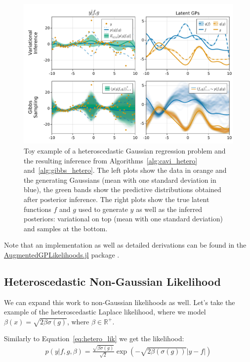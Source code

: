 \begin{figure}
\includegraphics[width=\textwidth]{./chapters/8_discussions/figures/heteroscedastic.pdf}
\caption{Toy example of a heteroscedastic Gaussian regression problem and the resulting inference from Algorithms~\ref{alg:cavi_hetero} and~\ref{alg:gibbs_hetero}.
The left plots show the data in orange and the generating Gaussians (mean with one standard deviation in blue), the green bands show the predictive distributions obtained after posterior inference.
The right plots show the true latent functions $f$ and $g$ used to generate $y$ as well as the inferred posteriors: variational on top (mean with one standard deviation) and samples at the bottom.}
\label{fig:heteroscedastic}
\end{figure}

Note that an implementation as well as detailed derivations can be found in the \href{https://github.com/JuliaGaussianProcesses/AugmentedGPLikelihoods.jl}{AugmentedGPLikelihoods.jl} package \cite{theo_galy_fajou_2022_6347022}.
\subsection{Heteroscedastic Non-Gaussian Likelihood}

We can expand this work to non-Gaussian likelihoods as well.
Let's take the example of the heteroscedastic Laplace likelihood, where we model $\beta(x) = \sqrt{2\beta \sigma(g)}$, where $\beta \in \mathbb{R}^+$.


Similarly to Equation~\ref{eq:hetero_lik} we get the likelihood:
\begin{align*}
    p(y|f,g,\beta) = \frac{\sqrt{\beta\sigma(g)}}{\sqrt{2}}\exp\left(-\sqrt{2\beta(\sigma(g))}|y-f|\right)
    \label{eq:hetero_lik_laplace}
\end{align*}

